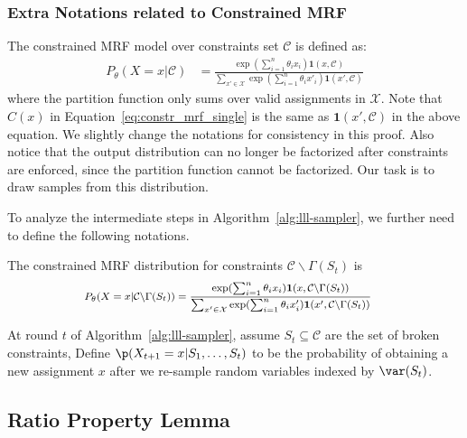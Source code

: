 \subsubsection{Extra Notations related to Constrained MRF}
The constrained MRF model over constraints set $\mathcal{C}$ is defined as:
\begin{align*}
P_{\theta}(X=x|\mathcal{C})&=\frac{\exp(\sum_{i=1}^n\theta_i x_i)\mathbf{1}(x,\mathcal{C})}{\sum_{x'\in\mathcal{X}}\exp(\sum_{i=1}^n\theta_i x'_i)\mathbf{1}(x',\mathcal{C})}
\end{align*}
where the partition function only sums over valid assignments in $\mathcal{X}$. Note that $C(x)$ in Equation~\eqref{eq:constr_mrf_single} is the same as $\mathbf{1}(x',\mathcal{C})$ in the above equation. We slightly change the notations for consistency in this proof. Also notice that the output distribution can no longer be factorized after constraints are enforced, since the partition function cannot be factorized. Our task is to draw samples from this distribution. 

To analyze the intermediate steps in Algorithm~\ref{alg:lll-sampler}, we further need to define the following notations.
\begin{definition}  \label{def:general-cmrf}
The constrained MRF distribution for constraints $\mathcal{C}\backslash \Gamma(S_t)$ is
\begin{equation*}\footnotesize
\begin{aligned}
P_{\theta}(X=x|\mathcal{C}\backslash \Gamma(S_t))&=\frac{\exp(\sum_{i=1}^n\theta_i x_i)\mathbf{1}(x,\mathcal{C}\backslash \Gamma(S_t))}{\sum_{x'\in\mathcal{X}}\exp(\sum_{i=1}^n\theta_i x'_i)\mathbf{1}(x',\mathcal{C}\backslash \Gamma(S_t))}
\end{aligned}
\end{equation*}
\end{definition}

\begin{definition}  \label{def:prs-prob}
At round $t$ of Algorithm~\ref{alg:lll-sampler}, assume $S_t\subseteq\mathcal{C}$ are the set of broken constraints,  Define $\p(X_{t+1}=x|S_1,\ldots, S_t)$ to be the probability of obtaining a new assignment $x$ after we re-sample random variables indexed by $\var(S_t)$.
\end{definition}









\subsection{Ratio Property Lemma}




